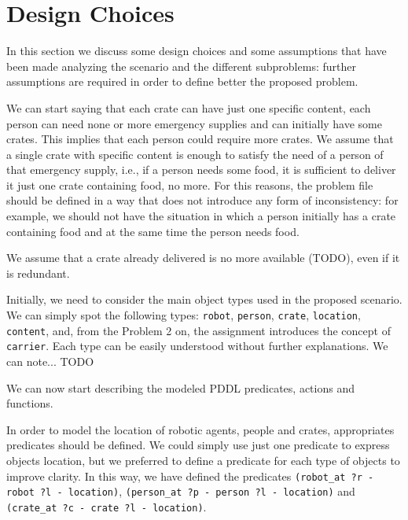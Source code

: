
\section{Design Choices}
\label{sec3}

In this section we discuss some design choices and some assumptions that have been made 
analyzing the scenario and the different subproblems: further assumptions are required 
in order to define better the proposed problem.

We can start saying that each crate can have just one specific content, each person can need none or 
more emergency supplies and can initially have some crates. This implies that each person could require 
more crates.
We assume that a single crate with specific content is enough to satisfy the need of a person of that emergency 
supply, i.e., if a person needs some food, it is sufficient to deliver it just one crate containing food, no more. 
For this reasons, the problem file should be defined in a way that does not introduce any form of inconsistency:
for example, we should not have the situation in which a person initially has a crate containing food and at 
the same time the person needs food.

We assume that a crate already delivered is no more available (TODO), even if it is redundant.


Initially, we need to consider the main object types used in the proposed scenario.
We can simply spot the following types: \texttt{robot}, \texttt{person}, \texttt{crate}, \texttt{location}, 
\texttt{content}, and, from the Problem 2 on, the assignment introduces the concept of \texttt{carrier}.
Each type can be easily understood without further explanations. 
We can note... TODO

We can now start describing the modeled PDDL predicates, actions and functions.


In order to model the location of robotic agents, people and crates, appropriates predicates should be defined.
We could simply use just one predicate to express objects location, but we preferred to define a predicate for 
each type of objects to improve clarity. In this way, we have defined the predicates 
\texttt{(robot\_at ?r - robot ?l - location)}, \texttt{(person\_at ?p - person ?l - location)} and 
\texttt{(crate\_at ?c - crate ?l - location)}.




